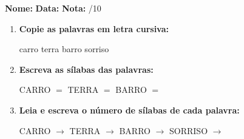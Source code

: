 \begin{exercicio}



\noindent\textbf{Nome:} \underline{\hspace{3.2cm}} \quad \textbf{Data:} \underline{\hspace{1.6cm}} \quad \textbf{Nota:} \underline{\hspace{0.9cm}}/10


\begin{enumerate}

  \item \textbf{Copie as palavras em letra cursiva:}
  \begin{center}
  carro \quad terra \quad barro \quad sorriso
  \end{center}
  \begin{center}
  \underline{\hspace{2.4cm}} \quad \underline{\hspace{2.4cm}} \quad \underline{\hspace{2.4cm}} \quad \underline{\hspace{2.4cm}}
  \end{center}

  \item \textbf{Escreva as sílabas das palavras:}
  \begin{center}
  CARRO $=$ \underline{\hspace{1.5cm}} \underline{\hspace{1.5cm}} \quad TERRA $=$ \underline{\hspace{1.5cm}} \underline{\hspace{1.5cm}} \quad BARRO $=$ \underline{\hspace{1.5cm}} \underline{\hspace{1.5cm}}
  \end{center}

  \item \textbf{Leia e escreva o número de sílabas de cada palavra:}
  \begin{center}
  CARRO $\rightarrow$ \underline{\hspace{0.9cm}} \quad TERRA $\rightarrow$ \underline{\hspace{0.9cm}} \quad BARRO $\rightarrow$ \underline{\hspace{0.9cm}} \quad SORRISO $\rightarrow$ \underline{\hspace{0.9cm}}
  \end{center}


\end{enumerate}
\end{exercicio}
